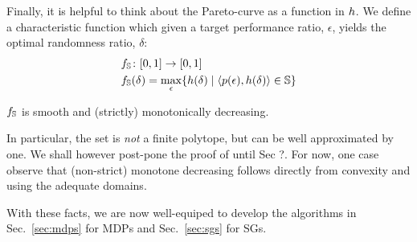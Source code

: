 Finally, it is helpful to think about the Pareto-curve as a function
in $h$.  We define a characteristic function which given a target
performance ratio, $\epsilon$, yields the optimal randomness ratio,
$\delta$:
\begin{equation}
  \begin{split}
    & f_\mathbb{S}\colon [0,1] \rightarrow [0, 1]    \\
    & f_\mathbb{S}(\delta) = \max_\epsilon \{ h(\delta) \mid \langle
    p(\epsilon), h(\delta) \rangle \in \mathbb{S} \} 
  \end{split}
\end{equation}
\begin{proposition}\label{prop:monotone}
  $f_\mathbb{S}$ is smooth and (strictly) monotonically decreasing.
\end{proposition}
In particular, the set is \emph{not} a finite polytope, but can be
well approximated by one. We shall however post-pone the proof of
 until Sec ?. For now, one case observe that
(non-strict) monotone decreasing follows directly from convexity and
using the adequate domains.


With these facts, we are now well-equiped to develop the algorithms in Sec.~\ref{sec:mdps} for MDPs and Sec.~\ref{sec:sgs} for SGs.

